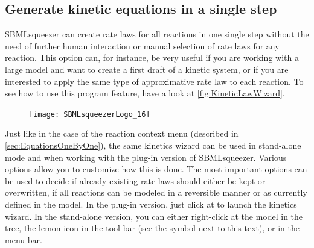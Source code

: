 \subsection{Generate kinetic equations in a single step}

SBMLsqueezer can create rate laws for all reactions in one single step without the need of further human interaction or manual selection of rate laws for any reaction.
This option can, for instance, be very useful if you are working with a large model and want to create a first draft of a kinetic system, or if you are interested to apply the same type of approximative rate law to each reaction.
To see how to use this program feature, have a look at \vref{fig:KineticLawWizard}.

\begin{figure}
\vspace{\wrapfigspace}
\texttt{[image: SBMLsqueezerLogo\_16]}
\end{figure}
Just like in the case of the reaction context menu (described in \vref{sec:EquationsOneByOne}), the same kinetics wizard can be used in stand-alone mode and when working with the \CellDesigner plug-in version of SBMLsqueezer.
Various options allow you to customize how this is done.
The most important options can be used to decide if already existing rate laws should either be kept or overwritten, if all reactions can be modeled in a reversible manner or as currently defined in the model.
In the \CellDesigner plug-in version, just click at  to launch the kinetics wizard.
In the stand-alone version, you can either right-click at the model in the \SBML tree, the lemon icon in the tool bar (see the symbol next to this text), or  in the menu bar.


